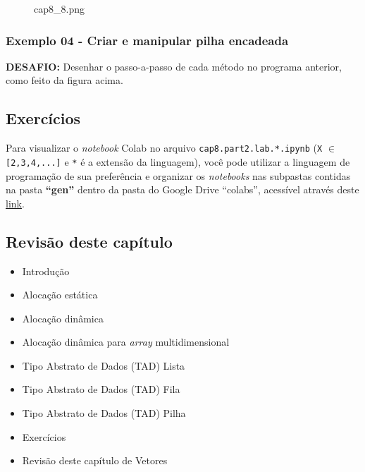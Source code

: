 \documentclass[12pt,a4paper]{article}
\providecommand{\tightlist}{%
      \setlength{\itemsep}{0pt}\setlength{\parskip}{0pt}}
\begin{document}
    \begin{figure}
\centering
\caption{cap8\_8.png}
\end{figure}

    \hypertarget{exemplo-04---criar-e-manipular-pilha-encadeada}{%
\subsubsection{Exemplo 04 - Criar e manipular pilha
encadeada}\label{exemplo-04---criar-e-manipular-pilha-encadeada}}

    \textbf{DESAFIO:} Desenhar o passo-a-passo de cada método no programa
anterior, como feito da figura acima.

    \hypertarget{exercuxedcios}{%
\subsection{Exercícios}\label{exercuxedcios}}

    Para visualizar o \emph{notebook} Colab no arquivo
\texttt{cap8.part2.lab.*.ipynb} (\texttt{X} \(\in\)
\texttt{{[}2,3,4,...{]}} e \texttt{*} é a extensão da linguagem), você
pode utilizar a linguagem de programação de sua preferência e organizar
os \emph{notebooks} nas subpastas contidas na pasta \textbf{``gen''}
dentro da pasta do Google Drive ``colabs'', acessível através deste
\href{https://drive.google.com/drive/folders/1YlFwv8XYN7PYYf-HwDMlkxzbmXzJw9cM?usp=sharing}{link}.

    \hypertarget{revisuxe3o-deste-capuxedtulo}{%
\subsection{Revisão deste capítulo}\label{revisuxe3o-deste-capuxedtulo}}

\begin{itemize}
\tightlist
\item
  Introdução
\item
  Alocação estática
\item
  Alocação dinâmica
\item
  Alocação dinâmica para \emph{array} multidimensional
\item
  Tipo Abstrato de Dados (TAD) Lista
\item
  Tipo Abstrato de Dados (TAD) Fila
\item
  Tipo Abstrato de Dados (TAD) Pilha
\item
  Exercícios
\item
  Revisão deste capítulo de Vetores
\end{itemize}


    
    
    
\end{document}
